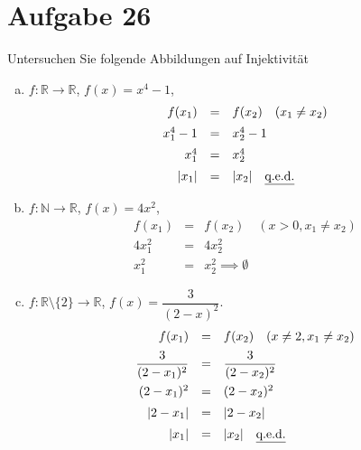 \section{Aufgabe 26}
\setcounter{section}{26}

Untersuchen Sie folgende Abbildungen auf Injektivität

\begin{enumerate}[(a)]
    \item $f : \mathbb{R} \rightarrow \mathbb{R}$, $f(x) = x^4 - 1$,
        \begin{equation*}
            \begin{array}{rcl}
                f(x_1) &=& f(x_2) \quad (x_1 \neq x_2) \\[5pt]
                x_1^4 - 1 &=& x_2^4 - 1 \\[5pt]
                x_1^4 &=& x_2^4 \\[5pt]
                |x_1| &=& |x_2| \quad \text{\underline{q.e.d.}}
            \end{array}
        \end{equation*}

    \item $f : \mathbb{N} \rightarrow \mathbb{R}$, $f(x) = 4x^2$,
        \begin{equation*}
            \begin{array}{rcl}
                f(x_1) &=& f(x_2) \quad (x > 0, x_1 \neq x_2) \\[5pt]
                4x_1^2 &=& 4x_2^2 \\[5pt]
                x_1^2 &=& x_2^2 \implies \emptyset
            \end{array}
        \end{equation*}

    \item $f : \mathbb{R} \setminus \{2\} \rightarrow \mathbb{R}$, $f(x) = \dfrac{3}{(2 - x)^2}$.
        \begin{equation*}
            \begin{array}{rcl}
                f(x_1) &=& f(x_2) \quad (x \neq 2, x_1 \neq x_2) \\[5pt]
                \dfrac{3}{(2 - x_1)^2} &=& \dfrac{3}{(2 - x_2)^2} \\[10pt]
                (2 - x_1)^2 &=& (2 - x_2)^2 \\[5pt]
                |2 - x_1| &=& |2 - x_2| \\[5pt]
                |x_1| &=& |x_2| \quad \text{\underline{q.e.d.}}
            \end{array}
        \end{equation*}
\end{enumerate}
